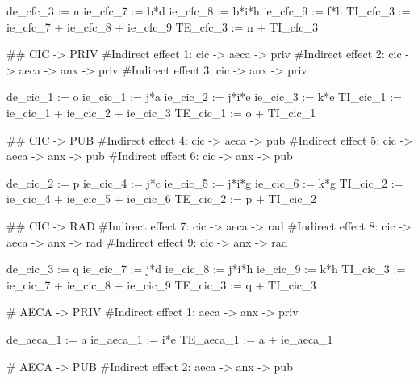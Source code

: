 \documentclass[
  letterpaper,
  DIV=11,
  numbers=noendperiod]{scrreprt}
\newenvironment{Shaded}{\begin{snugshade}}{\end{snugshade}}
\newcommand{\StringTok}[1]{\textcolor[rgb]{0.13,0.47,0.30}{#1}}
\begin{document}
\begin{Shaded}
\begin{Highlighting}[]
\StringTok{de\_cfc\_3 := n}
\StringTok{ie\_cfc\_7 := b*d}
\StringTok{ie\_cfc\_8 := b*i*h}
\StringTok{ie\_cfc\_9 := f*h}
\StringTok{TI\_cfc\_3 := ie\_cfc\_7 + ie\_cfc\_8 + ie\_cfc\_9}
\StringTok{TE\_cfc\_3 := n + TI\_cfc\_3}



\StringTok{\#\# CIC {-}\textgreater{} PRIV}
\StringTok{\#Indirect effect 1: cic {-}\textgreater{} aeca {-}\textgreater{} priv}
\StringTok{\#Indirect effect 2: cic {-}\textgreater{} aeca {-}\textgreater{} anx {-}\textgreater{} priv}
\StringTok{\#Indirect effect 3: cic {-}\textgreater{} anx {-}\textgreater{} priv}

\StringTok{de\_cic\_1 := o}
\StringTok{ie\_cic\_1 := j*a}
\StringTok{ie\_cic\_2 := j*i*e}
\StringTok{ie\_cic\_3 := k*e}
\StringTok{TI\_cic\_1 := ie\_cic\_1 + ie\_cic\_2 + ie\_cic\_3}
\StringTok{TE\_cic\_1 := o + TI\_cic\_1}


\StringTok{\#\# CIC {-}\textgreater{} PUB}
\StringTok{\#Indirect effect 4: cic {-}\textgreater{} aeca {-}\textgreater{} pub}
\StringTok{\#Indirect effect 5: cic {-}\textgreater{} aeca {-}\textgreater{} anx {-}\textgreater{} pub}
\StringTok{\#Indirect effect 6: cic {-}\textgreater{} anx {-}\textgreater{} pub}

\StringTok{de\_cic\_2 := p}
\StringTok{ie\_cic\_4 := j*c}
\StringTok{ie\_cic\_5 := j*i*g}
\StringTok{ie\_cic\_6 := k*g}
\StringTok{TI\_cic\_2 := ie\_cic\_4 + ie\_cic\_5 + ie\_cic\_6}
\StringTok{TE\_cic\_2 := p + TI\_cic\_2}


\StringTok{\#\# CIC {-}\textgreater{} RAD}
\StringTok{\#Indirect effect 7: cic {-}\textgreater{} aeca {-}\textgreater{} rad}
\StringTok{\#Indirect effect 8: cic {-}\textgreater{} aeca {-}\textgreater{} anx {-}\textgreater{} rad}
\StringTok{\#Indirect effect 9: cic {-}\textgreater{} anx {-}\textgreater{} rad}

\StringTok{de\_cic\_3 := q}
\StringTok{ie\_cic\_7 := j*d}
\StringTok{ie\_cic\_8 := j*i*h}
\StringTok{ie\_cic\_9 := k*h}
\StringTok{TI\_cic\_3 := ie\_cic\_7 + ie\_cic\_8 + ie\_cic\_9}
\StringTok{TE\_cic\_3 := q + TI\_cic\_3}



\StringTok{\# AECA {-}\textgreater{} PRIV}
\StringTok{\#Indirect effect 1: aeca {-}\textgreater{} anx {-}\textgreater{} priv}

\StringTok{de\_aeca\_1 := a}
\StringTok{ie\_aeca\_1 := i*e}
\StringTok{TE\_aeca\_1 := a + ie\_aeca\_1}

\StringTok{\# AECA {-}\textgreater{} PUB}
\StringTok{\#Indirect effect 2: aeca {-}\textgreater{} anx {-}\textgreater{} pub}


\end{Highlighting}
\end{Shaded}
\end{document}
